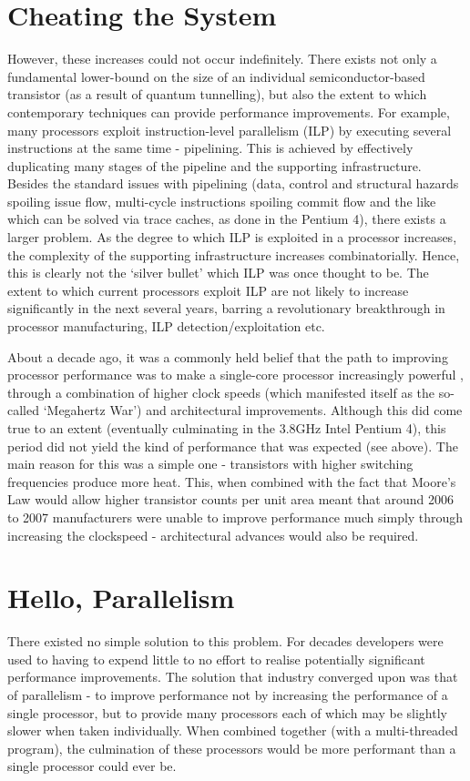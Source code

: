 \section{Cheating the System} \label{sec:introduction/cheating}
However, these increases could not occur indefinitely. There exists not only a fundamental lower-bound on the size of an individual semiconductor-based transistor (as a result of quantum tunnelling), but also the extent to which contemporary techniques can provide performance improvements. For example, many processors exploit instruction-level parallelism (ILP) by executing several instructions at the same time - pipelining. This is achieved by effectively duplicating many stages of the pipeline and the supporting infrastructure. Besides the standard issues with pipelining (data, control and structural hazards spoiling issue flow, multi-cycle instructions spoiling commit flow and the like which can be solved via trace caches, as done in the Pentium 4), there exists a larger problem. As the degree to which ILP is exploited in a processor increases, the complexity of the supporting infrastructure increases combinatorially. Hence, this is clearly not the `silver bullet' which ILP was once thought to be. The extent to which current processors exploit ILP are not likely to increase significantly in the next several years, barring a revolutionary breakthrough in processor manufacturing, ILP detection/exploitation etc.

About a decade ago, it was a commonly held belief that the path to improving processor performance was to make a single-core processor increasingly powerful \citep{Nayfeh1997}, through a combination of higher clock speeds (which manifested itself as the so-called `Megahertz War') and architectural improvements. Although this did come true to an extent (eventually culminating in the 3.8GHz Intel Pentium 4), this period did not yield the kind of performance that was expected (see above). The main reason for this was a simple one - transistors with higher switching frequencies produce more heat. This, when combined with the fact that Moore's Law would allow higher transistor counts per unit area meant that around 2006 to 2007 manufacturers were unable to improve performance much simply through increasing the clockspeed - architectural advances would also be required.

\section{Hello, Parallelism} \label{sec:introduction/parallelism}
There existed no simple solution to this problem. For decades developers were used to having to expend little to no effort to realise potentially significant performance improvements. The solution that industry converged upon was that of parallelism - to improve performance not by increasing the performance of a single processor, but to provide many processors each of which may be slightly slower when taken individually. When combined together (with a multi-threaded program), the culmination of these processors would be more performant than a single processor could ever be.

